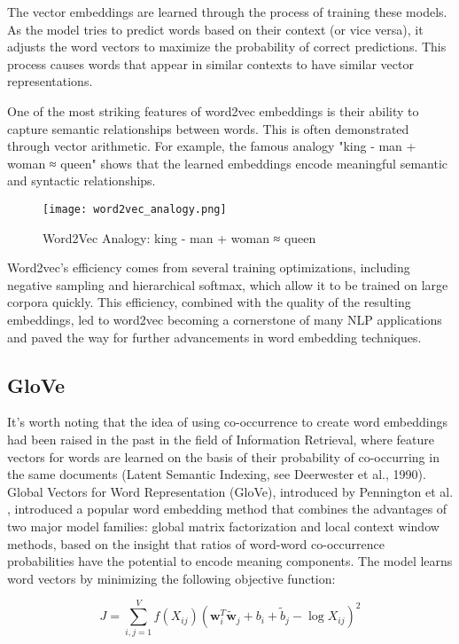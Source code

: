 \documentclass[a4paper, oneside]{discothesis}
\begin{document}
The vector embeddings are learned through the process of training these models. As the model tries to predict words based on their context (or vice versa), it adjusts the word vectors to maximize the probability of correct predictions. This process causes words that appear in similar contexts to have similar vector representations.

One of the most striking features of word2vec embeddings is their ability to capture semantic relationships between words. This is often demonstrated through vector arithmetic. For example, the famous analogy "king - man + woman ≈ queen" shows that the learned embeddings encode meaningful semantic and syntactic relationships.

\begin{figure}[h]
    \centering
    \texttt{[image: word2vec\_analogy.png]}
    \caption{Word2Vec Analogy: king - man + woman ≈ queen}
    \label{fig:word2vec_analogy}
\end{figure}

Word2vec's efficiency comes from several training optimizations, including negative sampling and hierarchical softmax, which allow it to be trained on large corpora quickly. This efficiency, combined with the quality of the resulting embeddings, led to word2vec becoming a cornerstone of many NLP applications and paved the way for further advancements in word embedding techniques.

\subsection{GloVe}
It's worth noting that the idea of using co-occurrence to create word embeddings had been raised in the past in the field of Information Retrieval, where feature vectors for words are learned on the basis of their probability of co-occurring in the same documents (Latent Semantic Indexing, see Deerwester et al., 1990).
Global Vectors for Word Representation (GloVe), introduced by Pennington et al. \cite{pennington2014glove}, introduced a popular word embedding method that combines the advantages of two major model families: global matrix factorization and local context window methods, based on the insight that ratios of word-word co-occurrence probabilities have the potential to encode meaning components. 
The model learns word vectors by minimizing the following objective function:

\begin{equation}
J = \sum_{i,j=1}^V f(X_{ij})(\mathbf{w}_i^T\tilde{\mathbf{w}}_j + b_i + \tilde{b}_j - \log X_{ij})^2
\end{equation}
\end{document}
